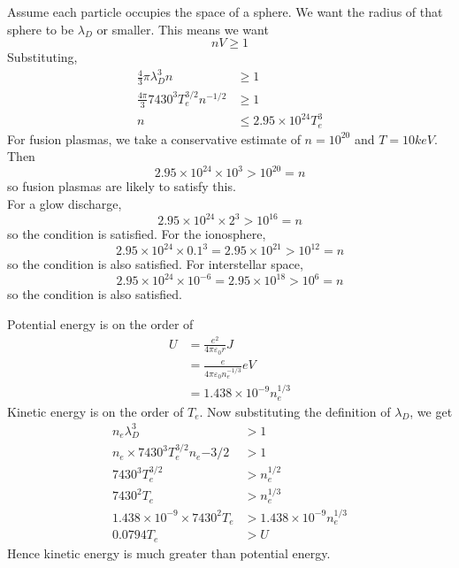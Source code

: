 \documentclass[answers]{exam}
\begin{document}
\begin{questions}
\begin{solution}
    Assume each particle occupies the space of a sphere. We want the radius of that sphere to be $\lambda_D$ or smaller. This means we want
    $$nV \geq 1$$
    Substituting,
    \begin{align*}
        \frac{4}{3} \pi \lambda_D^3 n &\geq 1 \\
        \frac{4\pi}{3} 7430^3 T_e^{3/2} n^{-1/2} &\geq 1 \\
        n &\leq 2.95 \times 10^{24} T_e^3
    \end{align*}
    For fusion plasmas, we take a conservative estimate of $n=10^{20}$ and $T = 10\unit{keV}$. Then
    $$2.95 \times 10^{24} \times 10^3 > 10^{20} = n$$
    so fusion plasmas are likely to satisfy this. \\
    For a glow discharge,
    $$2.95 \times 10^{24} \times 2^3 > 10^{16} = n$$
    so the condition is satisfied. For the ionosphere,
    $$2.95 \times 10^{24} \times 0.1^3 = 2.95 \times 10^{21} > 10^{12} = n$$
    so the condition is also satisfied. For interstellar space,
    $$2.95 \times 10^{24} \times 10^{-6} = 2.95 \times 10^{18} > 10^6 = n$$
    so the condition is also satisfied.
\end{solution}


\begin{solution}
    Potential energy is on the order of
    \begin{align*}
        U &= \frac{e^2}{4\pi\varepsilon_0r}\unit{J} \\
          &= \frac{e}{4\pi\varepsilon_0n_e^{-1/3}}\unit{eV} \\
          &= 1.438 \times 10^{-9} n_e^{1/3}
    \end{align*}
    Kinetic energy is on the order of $T_e$. Now substituting the definition of $\lambda_D$, we get
    \begin{align*}
        n_e\lambda_D^3 &> 1 \\
        n_e \times 7430^3 T_e^{3/2} n_e{-3/2} &> 1 \\
        7430^3 T_e^{3/2} &> n_e^{1/2} \\
        7430^2 T_e &> n_e^{1/3} \\
        1.438 \times 10^{-9} \times 7430^2 T_e &> 1.438 \times 10^{-9}n_e^{1/3} \\
        0.0794 T_e &> U
    \end{align*}
    Hence kinetic energy is much greater than potential energy.
\end{solution}


\end{questions}
\end{document}
